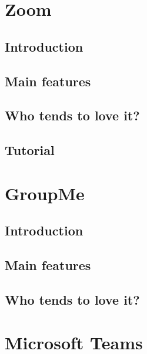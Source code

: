 \documentclass[
]{book}
\begin{document}
\hypertarget{zoom}{%
\section{Zoom}\label{zoom}}

\hypertarget{introduction-5}{%
\subsection{Introduction}\label{introduction-5}}

\hypertarget{main-features-4}{%
\subsection{Main features}\label{main-features-4}}

\hypertarget{who-tends-to-love-it-4}{%
\subsection{Who tends to love it?}\label{who-tends-to-love-it-4}}

\hypertarget{tutorial-2}{%
\subsection{Tutorial}\label{tutorial-2}}

\hypertarget{groupme}{%
\section{GroupMe}\label{groupme}}

\hypertarget{introduction-6}{%
\subsection{Introduction}\label{introduction-6}}

\hypertarget{main-features-5}{%
\subsection{Main features}\label{main-features-5}}

\hypertarget{who-tends-to-love-it-5}{%
\subsection{Who tends to love it?}\label{who-tends-to-love-it-5}}

\hypertarget{microsoft-teams}{%
\section{Microsoft Teams}\label{microsoft-teams}}
\end{document}
